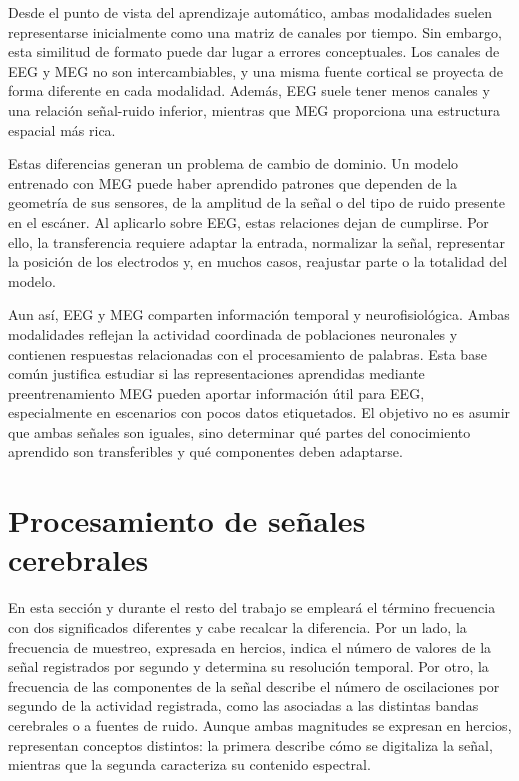 Desde el punto de vista del aprendizaje automático, ambas modalidades suelen representarse inicialmente como una matriz de canales por tiempo. Sin embargo, esta similitud de formato puede dar lugar a errores conceptuales. Los canales de EEG y MEG no son intercambiables, y una misma fuente cortical se proyecta de forma diferente en cada modalidad. Además, EEG suele tener menos canales y una relación señal-ruido inferior, mientras que MEG proporciona una estructura espacial más rica.

Estas diferencias generan un problema de cambio de dominio. Un modelo entrenado con MEG puede haber aprendido patrones que dependen de la geometría de sus sensores, de la amplitud de la señal o del tipo de ruido presente en el escáner. Al aplicarlo sobre EEG, estas relaciones dejan de cumplirse. Por ello, la transferencia requiere adaptar la entrada, normalizar la señal, representar la posición de los electrodos y, en muchos casos, reajustar parte o la totalidad del modelo.

Aun así, EEG y MEG comparten información temporal y neurofisiológica. Ambas modalidades reflejan la actividad coordinada de poblaciones neuronales y contienen respuestas relacionadas con el procesamiento de palabras. Esta base común justifica estudiar si las representaciones aprendidas mediante preentrenamiento MEG pueden aportar información útil para EEG, especialmente en escenarios con pocos datos etiquetados. El objetivo no es asumir que ambas señales son iguales, sino determinar qué partes del conocimiento aprendido son transferibles y qué componentes deben adaptarse.

\section{Procesamiento de señales cerebrales}

En esta sección y durante el resto del trabajo se empleará el término frecuencia con dos significados diferentes y cabe recalcar la diferencia. Por un lado, la frecuencia de muestreo, expresada en hercios, indica el número de valores de la señal registrados por segundo y determina su resolución temporal. Por otro, la frecuencia de las componentes de la señal describe el número de oscilaciones por segundo de la actividad registrada, como las asociadas a las distintas bandas cerebrales o a fuentes de ruido. Aunque ambas magnitudes se expresan en hercios, representan conceptos distintos: la primera describe cómo se digitaliza la señal, mientras que la segunda caracteriza su contenido espectral.


